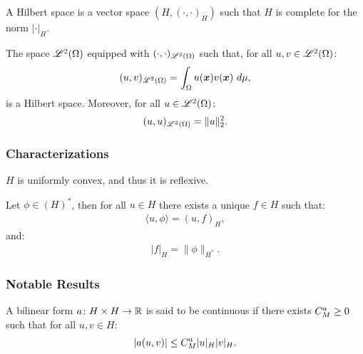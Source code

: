 \begin{definition}
    A Hilbert space is a vector space $(H, (\cdot, \cdot)_H)$ such that $H$ is complete for the norm $\lvert \cdot \rvert_H$.
\end{definition}

\begin{remark}
    The space $\mathscr{L}^{2}(\Omega)$ equipped with $(\cdot, \cdot)_{\mathscr{L}^{2}(\Omega)}$ such that, for all $u, v \in \mathscr{L}^{2}(\Omega)$:
    \begin{gather}
        (u, v)_{\mathscr{L}^{2}(\Omega)} = \int_{\Omega} u(\bm{x}) v(\bm{x}) ~ d \mu,
    \end{gather}
    is a Hilbert space. Moreover, for all $u \in \mathscr{L}^{2}(\Omega)$:
    \begin{gather}
        (u, u)_{\mathscr{L}^{2}(\Omega)} = \lVert u \rVert_2^2.
    \end{gather}
\end{remark}

\subsubsection{Characterizations}

\begin{theorem}
    $H$ is uniformly convex, and thus it is reflexive.
\end{theorem}

\begin{theorem}
    Let $\phi \in (H)^*$, then for all $u \in H$ there exists a unique $f \in H$ such that:
    \begin{gather}
        \langle u, \phi \rangle = (u, f)_H,
    \end{gather}
    and:
    \begin{gather}
        \lvert f \rvert_H = \lVert \phi \rVert_{H^*}.
    \end{gather}
\end{theorem}

\subsubsection{Notable Results}

\begin{definition}
    A bilinear form $a \colon H \times H \rightarrow \mathbb{R}$ is said to be continuous if there exists $C^{a}_M \geq 0$ such that for all $u, v \in H$:
    \begin{gather}
        \lvert a(u, v) \rvert \leq C^{a}_M \lvert u \rvert_H \lvert v \rvert_H.
    \end{gather}
\end{definition}

